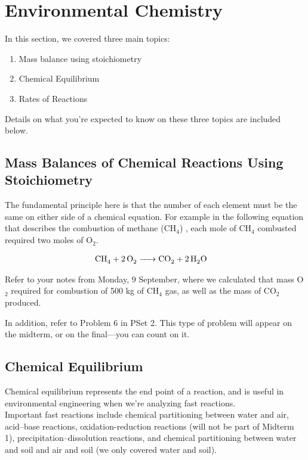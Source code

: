 \documentclass[12pt,letterpaper]{article}
\begin{document}
\section {Environmental Chemistry}
In this section, we covered three main topics:

\begin{enumerate}
\item Mass balance using stoichiometry
\item Chemical Equilibrium
\item Rates of Reactions\\ 
\end{enumerate}

Details on what you're expected to know on these three topics are included below.  

\subsection {Mass Balances of Chemical Reactions Using Stoichiometry}
The fundamental principle here is that the number of each element must be the same on either side of a chemical equation. For example in the following equation that describes the combustion of methane (CH$_4$)  , each mole of CH$_4$ combusted required two moles of O$_2$. 

\begin{align}
\cee{CH_4 + 2O_2  &-> CO_{2} + 2H_2O}
\end{align}

Refer to your notes from Monday, 9 September, where we calculated that mass O$_2$ required for combustion of 500 kg of CH$_4$ gas, as well as the mass of CO$_2$ produced.

In addition, refer to Problem 6 in PSet 2.  This type of problem will appear on the midterm, or on the final---you can count on it.

\subsection {Chemical Equilibrium}

Chemical equilibrium represents the end point of a reaction, and is useful in environmental engineering when we're analyzing fast reactions.\\

Important fast reactions include chemical partitioning between water and air, acid--base reactions, oxidation-reduction reactions (will not be part of Midterm 1), precipitation--dissolution reactions, and chemical partitioning between water and soil and air and soil (we only covered water and soil).\\
\end{document}
